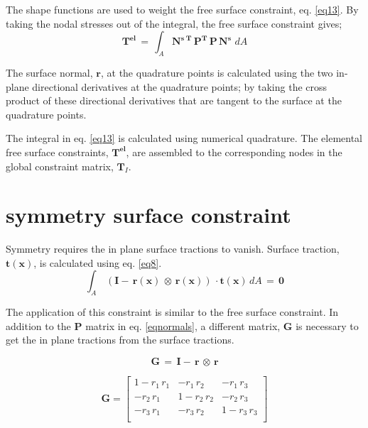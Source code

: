 \documentclass{article}
\begin{document}
The shape functions are used to weight the free surface constraint, eq. \eqref{eq13}. By taking the nodal stresses out of the integral, the free surface constraint gives;
\begin{equation}
\mathbf{T^{el}} \,= \, \int _A  \mathbf{N^{s\;T}} \,\mathbf{P^T} \, \mathbf{P} \, \mathbf{N^s} \, \, dA 
\label{eq13}
\end{equation}


The surface normal, $\mathbf{r}$, at the quadrature points is calculated using the two in-plane directional derivatives at the quadrature points; by taking the cross product of these directional derivatives that are tangent to the surface at the quadrature points.

The integral in eq. \ref{eq13} is calculated using numerical quadrature. The elemental free surface constraints, $\mathbf{T^{el}}$, are assembled to the corresponding nodes in the global constraint matrix, $\mathbf{T}_I$.


\section{symmetry surface constraint}
Symmetry requires the in plane surface tractions to vanish. Surface traction, $\mathbf{t(x)}$, is calculated using eq. \eqref{eq8}.
\begin{equation}
\int _A \, (\mathbf{I}-\,\mathbf{r(x)}\,\otimes \, \mathbf{r(x)})\, \cdot \mathbf{t(x)} \, dA \,=\, \mathbf{0}
\end{equation}



The application of this constraint is similar to the free surface constraint. In addition to the $\mathbf{P}$ matrix in eq. \eqref{eqnormals}, a different matrix, $\mathbf{G}$ is necessary to get the in plane tractions from the surface tractions.


\begin{equation}
\mathbf{G}\,=\,\mathbf{I}-\,\mathbf{r}\,\otimes \, \mathbf{r}
\end{equation}

\begin{equation}
\mathbf{G} = \left[{ \begin{array}{cccccc}
		1-r_1\,r_1 & -r_1\,r_2 & -r_1\,r_3 \\
		-r_2\,r_1 & 1-r_2\,r_2 & -r_2\,r_3 \\
		-r_3\,r_1 & -r_3\,r_2 & 1-r_3\,r_3\\
\end{array}} \right]
\end{equation}
\end{document}
